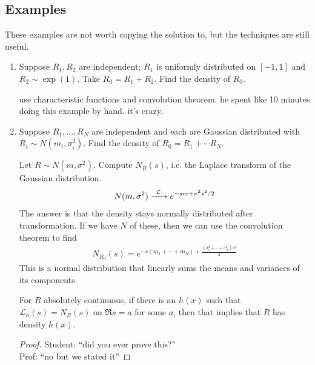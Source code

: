 \subsection{Examples}
These examples are not worth copying the solution to, but the techniques are still useful.
\begin{enumerate}
    \item Suppose $R_1,R_2$ are independent; $R_1$ is uniformly distributed on $[-1,1]$ and $R_2 \sim \exp(1)$. Take $R_0 = R_1 + R_2$. Find the density of $R_0$.
    \begin{solution}
        use characteristic functions and convolution theorem. he spent like 10 minutes doing this example by hand. it's crazy.
    \end{solution}
    \item Suppose $R_1,\ldots, R_N$ are independent and each are Gaussian distributed with $R_i \sim N(m_i, \sigma_i^2)$. Find the density of $R_0 = R_1 + \cdots R_N$. 
    \begin{solution}
        Let $R \sim N(m,\sigma^2)$. Compute $N_R(s)$, i.e. the Laplace transform of the Gaussian distribution. 
        \begin{align}
            N(m,\sigma^2) \ce{->[$\mathcal{L}$]} e^{-sm + \sigma^2s^2/2}
        \end{align}
        The answer is that the density stays normally distributed after transformation. If we have $N$ of these, then we can use the convolution theorem to find
        \begin{align}
            N_{R_0}(s) = e^{-s(m_1 + \cdots + m_N) + \frac{(\sigma_1^2 + \cdots + \sigma_N^2)s^2}{2}}
        \end{align}
        This is a normal distribution that linearly sums the means and variances of its components.
    \end{solution}

    \begin{aside}
        For $R$ absolutely continuous, if there is an $h(x)$ such that $\mathcal{L}_h(s) = N_R(s)$ on $\Re s = a$ for some $a$, then that implies that $R$ has density $h(x)$.
        \begin{proof}
            Student: ``did you ever prove this?''\\

            \noindent Prof: ``no but we stated it''
        \end{proof}
    \end{aside}
    

\end{enumerate}
